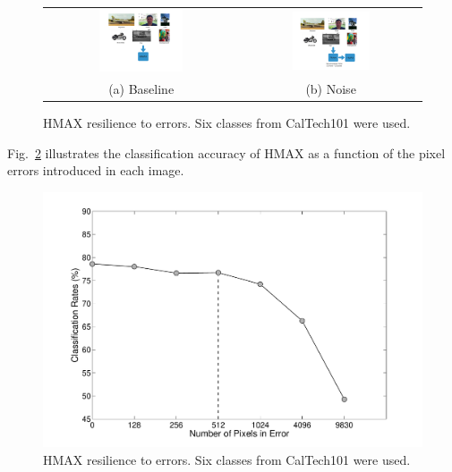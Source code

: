 \begin{figure}[!htb]
\centering
\begin{tabular}{@{}c@{} @{}c@{}}
\includegraphics[width=0.45\textwidth]{./figures/hmax_reliability_a.png} & \includegraphics[width=0.45\textwidth]{./figures/hmax_reliability_b.png}\\[\abovecaptionskip]
\small (a) Baseline & \small (b) Noise
\end{tabular}
\vspace{1pt}
\caption{HMAX resilience to errors. Six classes from CalTech101 were used.}
\label{tab:hmax_reliability}
\end{figure}

Fig.~\ref{fig:hmax_pixel_sensitivity} illustrates the classification accuracy of HMAX as a function of the pixel errors introduced in each image.

\begin{figure}[htb!]
\vspace{0pt}
\centering
\includegraphics[width=0.99\linewidth,trim={20 20 30 20}, clip]{./figures/PixelSensitivityAnalysis.pdf}
\vspace{0pt}
\caption{HMAX resilience to errors. Six classes from CalTech101 were used.}\label{fig:hmax_pixel_sensitivity}
\vspace{0pt}
\end{figure}


